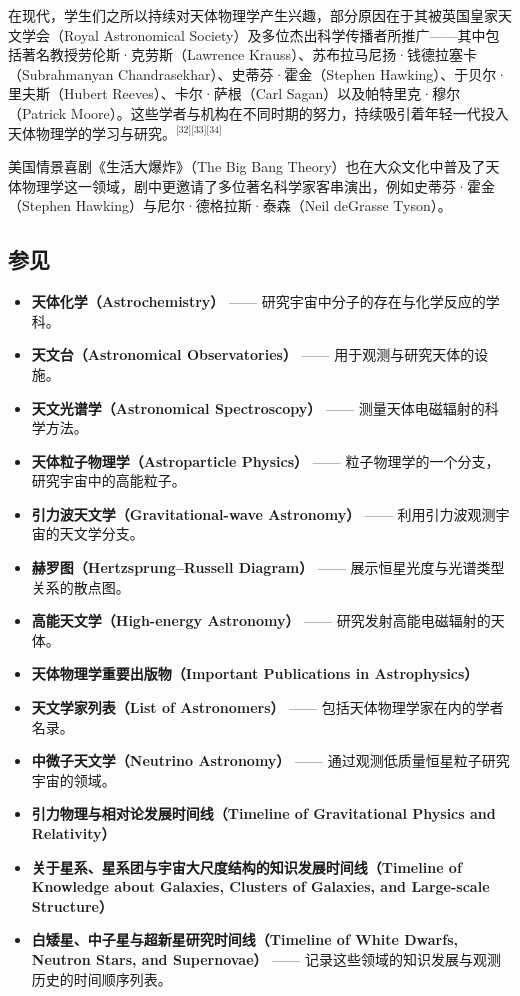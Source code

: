 在现代，学生们之所以持续对天体物理学产生兴趣，部分原因在于其被英国皇家天文学会（Royal Astronomical Society）及多位杰出科学传播者所推广——其中包括著名教授劳伦斯·克劳斯（Lawrence Krauss）、苏布拉马尼扬·钱德拉塞卡（Subrahmanyan Chandrasekhar）、史蒂芬·霍金（Stephen Hawking）、于贝尔·里夫斯（Hubert Reeves）、卡尔·萨根（Carl Sagan）以及帕特里克·穆尔（Patrick Moore）。这些学者与机构在不同时期的努力，持续吸引着年轻一代投入天体物理学的学习与研究。\(^\text{[32][33][34]}\)

美国情景喜剧《生活大爆炸》（The Big Bang Theory）也在大众文化中普及了天体物理学这一领域，剧中更邀请了多位著名科学家客串演出，例如史蒂芬·霍金（Stephen Hawking）与尼尔·德格拉斯·泰森（Neil deGrasse Tyson）。
\subsection{参见}
\begin{itemize}
  \item \textbf{天体化学（Astrochemistry）} —— 研究宇宙中分子的存在与化学反应的学科。
  \item \textbf{天文台（Astronomical Observatories）} —— 用于观测与研究天体的设施。
  \item \textbf{天文光谱学（Astronomical Spectroscopy）} —— 测量天体电磁辐射的科学方法。
  \item \textbf{天体粒子物理学（Astroparticle Physics）} —— 粒子物理学的一个分支，研究宇宙中的高能粒子。
  \item \textbf{引力波天文学（Gravitational-wave Astronomy）} —— 利用引力波观测宇宙的天文学分支。
  \item \textbf{赫罗图（Hertzsprung–Russell Diagram）} —— 展示恒星光度与光谱类型关系的散点图。
  \item \textbf{高能天文学（High-energy Astronomy）} —— 研究发射高能电磁辐射的天体。
  \item \textbf{天体物理学重要出版物（Important Publications in Astrophysics）}
  \item \textbf{天文学家列表（List of Astronomers）} —— 包括天体物理学家在内的学者名录。
  \item \textbf{中微子天文学（Neutrino Astronomy）} —— 通过观测低质量恒星粒子研究宇宙的领域。
  \item \textbf{引力物理与相对论发展时间线（Timeline of Gravitational Physics and Relativity）}
  \item \textbf{关于星系、星系团与宇宙大尺度结构的知识发展时间线（Timeline of Knowledge about Galaxies, Clusters of Galaxies, and Large-scale Structure）}
  \item \textbf{白矮星、中子星与超新星研究时间线（Timeline of White Dwarfs, Neutron Stars, and Supernovae）} —— 记录这些领域的知识发展与观测历史的时间顺序列表。
\end{itemize}
